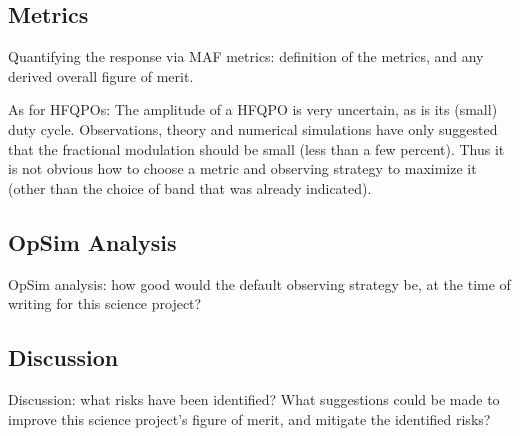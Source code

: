 
\subsection{Metrics}
\label{sec:\secname:metrics}

Quantifying the response via MAF metrics: definition of the metrics,
and any derived overall figure of merit.





As for HFQPOs: The amplitude of a HFQPO is very uncertain, as is its
(small) duty cycle. Observations, theory and numerical simulations have
only suggested that the fractional modulation should be small (less than
a few percent). Thus it is not obvious how to choose a metric and observing
strategy to maximize it (other than the choice of band that was already
indicated).



\subsection{OpSim Analysis}
\label{sec:\secname:analysis}

OpSim analysis: how good would the default observing strategy be, at
the time of writing for this science project?



\subsection{Discussion}
\label{sec:\secname:discussion}

Discussion: what risks have been identified? What suggestions could be
made to improve this science project's figure of merit, and mitigate
the identified risks?



\navigationbar
